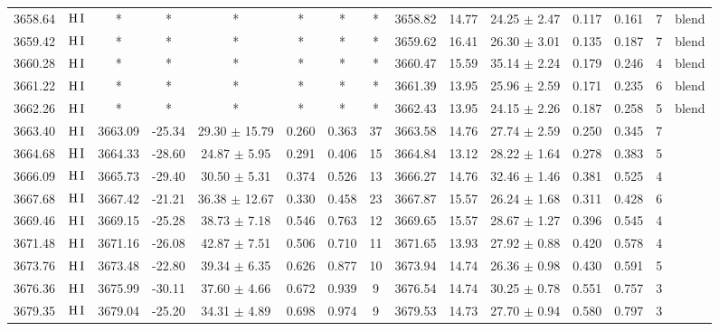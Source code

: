 \documentclass{article}
\begin{document}
\begin{table*}
\begin{adjustbox}{width=\textwidth}
\begin{tabular}{ccccccccccccccc}
3658.64 & $\mbox{H}\thinspace \mbox{I}$ & * & * & * & * & * & * & 3658.82 & 14.77 & 24.25 $\pm$ 2.47 & 0.117 & 0.161 & 7 &  blend \\
3659.42 & $\mbox{H}\thinspace \mbox{I}$ & * & * & * & * & * & * & 3659.62 & 16.41 & 26.30 $\pm$ 3.01 & 0.135 & 0.187 & 7 &  blend \\
3660.28 & $\mbox{H}\thinspace \mbox{I}$ & * & * & * & * & * & * & 3660.47 & 15.59 & 35.14 $\pm$ 2.24 & 0.179 & 0.246 & 4 &  blend \\
3661.22 & $\mbox{H}\thinspace \mbox{I}$ & * & * & * & * & * & * & 3661.39 & 13.95 & 25.96 $\pm$ 2.59 & 0.171 & 0.235 & 6 &  blend \\
3662.26 & $\mbox{H}\thinspace \mbox{I}$ & * & * & * & * & * & * & 3662.43 & 13.95 & 24.15 $\pm$ 2.26 & 0.187 & 0.258 & 5 &  blend \\
3663.40 & $\mbox{H}\thinspace \mbox{I}$ & 3663.09 & -25.34 & 29.30 $\pm$ 15.79 & 0.260 & 0.363 & 37 & 3663.58 & 14.76 & 27.74 $\pm$ 2.59 & 0.250 & 0.345 & 7 &  \\
3664.68 & $\mbox{H}\thinspace \mbox{I}$ & 3664.33 & -28.60 & 24.87 $\pm$ 5.95 & 0.291 & 0.406 & 15 & 3664.84 & 13.12 & 28.22 $\pm$ 1.64 & 0.278 & 0.383 & 5 &  \\
3666.09 & $\mbox{H}\thinspace \mbox{I}$ & 3665.73 & -29.40 & 30.50 $\pm$ 5.31 & 0.374 & 0.526 & 13 & 3666.27 & 14.76 & 32.46 $\pm$ 1.46 & 0.381 & 0.525 & 4 &  \\
3667.68 & $\mbox{H}\thinspace \mbox{I}$ & 3667.42 & -21.21 & 36.38 $\pm$ 12.67 & 0.330 & 0.458 & 23 & 3667.87 & 15.57 & 26.24 $\pm$ 1.68 & 0.311 & 0.428 & 6 &  \\
3669.46 & $\mbox{H}\thinspace \mbox{I}$ & 3669.15 & -25.28 & 38.73 $\pm$ 7.18 & 0.546 & 0.763 & 12 & 3669.65 & 15.57 & 28.67 $\pm$ 1.27 & 0.396 & 0.545 & 4 &  \\
3671.48 & $\mbox{H}\thinspace \mbox{I}$ & 3671.16 & -26.08 & 42.87 $\pm$ 7.51 & 0.506 & 0.710 & 11 & 3671.65 & 13.93 & 27.92 $\pm$ 0.88 & 0.420 & 0.578 & 4 &  \\
3673.76 & $\mbox{H}\thinspace \mbox{I}$ & 3673.48 & -22.80 & 39.34 $\pm$ 6.35 & 0.626 & 0.877 & 10 & 3673.94 & 14.74 & 26.36 $\pm$ 0.98 & 0.430 & 0.591 & 5 &  \\
3676.36 & $\mbox{H}\thinspace \mbox{I}$ & 3675.99 & -30.11 & 37.60 $\pm$ 4.66 & 0.672 & 0.939 & 9 & 3676.54 & 14.74 & 30.25 $\pm$ 0.78 & 0.551 & 0.757 & 3 &  \\
3679.35 & $\mbox{H}\thinspace \mbox{I}$ & 3679.04 & -25.20 & 34.31 $\pm$ 4.89 & 0.698 & 0.974 & 9 & 3679.53 & 14.73 & 27.70 $\pm$ 0.94 & 0.580 & 0.797 & 3 &  \\

\end{tabular}
\end{adjustbox}
\end{table*}
\end{document}

